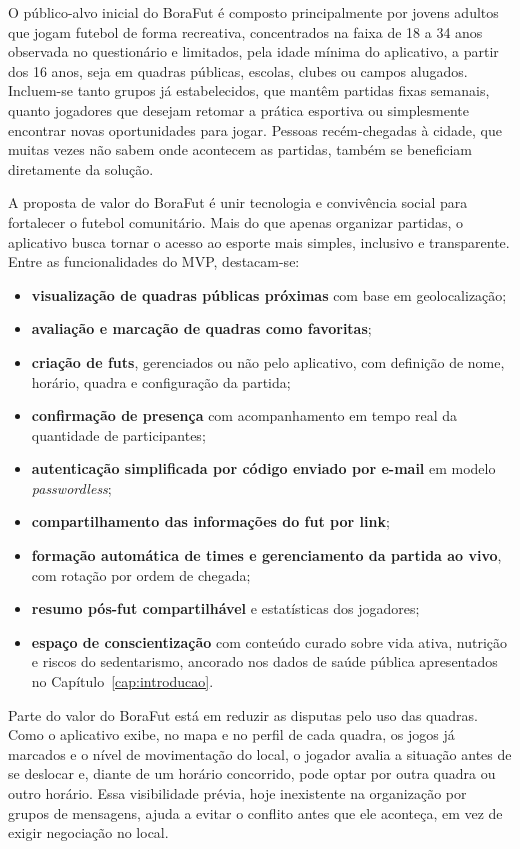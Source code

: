   O público-alvo inicial do BoraFut é composto principalmente por jovens adultos que jogam futebol de forma recreativa, concentrados na faixa de 18 a 34 anos observada no questionário e limitados, pela idade mínima do aplicativo, a partir dos 16 anos, seja em quadras públicas, escolas, clubes ou campos alugados. Incluem-se tanto grupos já estabelecidos, que mantêm partidas fixas semanais, quanto jogadores que desejam retomar a prática esportiva ou simplesmente encontrar novas oportunidades para jogar. Pessoas recém-chegadas à cidade, que muitas vezes não sabem onde acontecem as partidas, também se beneficiam diretamente da solução.

  A proposta de valor do BoraFut é unir tecnologia e convivência social para fortalecer o futebol comunitário. Mais do que apenas organizar partidas, o aplicativo busca tornar o acesso ao esporte mais simples, inclusivo e transparente. Entre as funcionalidades do MVP, destacam-se:
  \begin{itemize}
      \item \textbf{visualização de quadras públicas próximas} com base em geolocalização;
      \item \textbf{avaliação e marcação de quadras como favoritas};
      \item \textbf{criação de futs}, gerenciados ou não pelo aplicativo, com definição de nome, horário, quadra e configuração da partida;
      \item \textbf{confirmação de presença} com acompanhamento em tempo real da quantidade de participantes;
      \item \textbf{autenticação simplificada por código enviado por e-mail} em modelo \textit{passwordless};
      \item \textbf{compartilhamento das informações do fut por link};
      \item \textbf{formação automática de times e gerenciamento da partida ao vivo}, com rotação por ordem de chegada;
      \item \textbf{resumo pós-fut compartilhável} e estatísticas dos jogadores;
      \item \textbf{espaço de conscientização} com conteúdo curado sobre vida ativa, nutrição e riscos do sedentarismo, ancorado nos dados de saúde pública apresentados no Capítulo~\ref{cap:introducao}.
  \end{itemize}

  Parte do valor do BoraFut está em reduzir as disputas pelo uso das quadras. Como o aplicativo exibe, no mapa e no perfil de cada quadra, os jogos já marcados e o nível de movimentação do local, o jogador avalia a situação antes de se deslocar e, diante de um horário concorrido, pode optar por outra quadra ou outro horário. Essa visibilidade prévia, hoje inexistente na organização por grupos de mensagens, ajuda a evitar o conflito antes que ele aconteça, em vez de exigir negociação no local.

